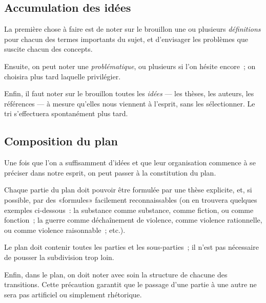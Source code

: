 \documentclass[a4paper,11pt]{article}
\begin{document}
\par

\subsection{Accumulation des idées}

La première chose à faire est de noter sur le brouillon une ou plusieurs
\emph{définitions} pour chacun des termes importants du sujet, et
d'envisager les problèmes que suscite chacun des concepts.

\par

Ensuite, on peut noter une \emph{problématique}, ou plusieurs si l'on
hésite encore~; on choisira plus tard laquelle privilégier.

\par

Enfin, il faut noter sur le brouillon toutes les \emph{idées} --- les
thèses, les auteurs, les références --- à mesure qu'elles nous viennent
à l'esprit, sans les sélectionner. Le tri s'effectuera spontanément plus
tard.

\par

\subsection{Composition du plan}

Une fois que l'on a suffisamment d'idées et que leur organisation
commence à se préciser dans notre esprit, on peut passer à la
constitution du plan. 

\par

Chaque partie du plan doit pouvoir être formulée par une thèse
explicite, et, si possible, par des «formules» facilement
reconnaissables (on en trouvera quelques exemples ci-dessous~: la
substance comme substance, comme fiction, ou comme fonction~; la guerre
comme déchaînement de violence, comme violence rationnelle, ou comme
violence raisonnable~; etc.).

\par

Le plan doit contenir toutes les parties et les sous-parties~; il n'est
pas nécessaire de pousser la subdivision trop loin.

\par

Enfin, dans le plan, on doit noter avec soin la structure de chacune des
transitions. Cette précaution garantit que le passage d'une partie à une
autre ne sera pas artificiel ou simplement rhétorique.
\end{document}
